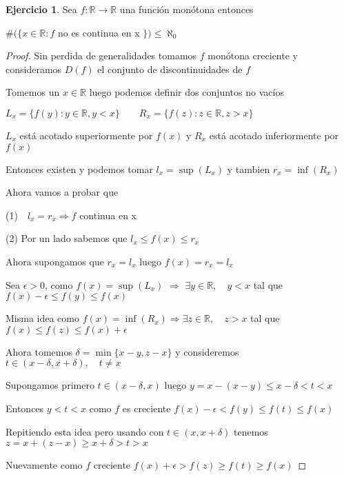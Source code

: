 \documentclass[12pt]{article}
\newcommand{\n}{\aleph_{0}}
\newcommand{\R}{\mathbb{R}}
\newcommand{\Ra}{\Rightarrow}
\newcommand{\ra}{\rightarrow}
\theoremstyle{definition}
\newtheorem{ej}{Ejercicio}
\begin{document}
\begin{ej}
\noindent 
Sea $f: \R \ra \R$ una función monótona entonces 
\begin{center} 
  $\# (\{x \in \R :f $ no es continua en x $\}) \leq \n$
\end{center}

\begin{proof}
  Sin perdida de generalidades tomamos $f$ monótona creciente y consideramos $D(f)$ el conjunto de discontinuidades de $f$

  Tomemos un $x \in \R$ luego podemos definir dos conjuntos no vacíos

  \begin{center} $ L_{x} = \{ f(y) : y \in \R, y<x\} \quad \quad      R_{x} = \{f(z): z \in \R, z>x \}$ \end{center}

  $L_{x}$ está acotado superiormente por $f(x)$ y $R_{x}$ está acotado inferiormente por $f(x)$

  Entonces existen y podemos tomar $l_{x} = \sup (L_{x})$ y tambien $r_{x} = \inf(R_{x})$

  Ahora vamos a probar que \begin{center} (1)$ \quad l_{x} = r_{x} \Ra f$ continua en x \end{center}

  (2) Por un lado sabemos que $ l_{x} \leq f(x) \leq r_{x}$

  Ahora supongamos que $r_{x} = l_{x}$ luego $f(x) = r_{x} = l_{x}$

  Sea $\epsilon  > 0$, como $f(x) = \sup(L_{x})$ $\Ra$ $\exists y \in \R , \quad y < x$ tal que $f(x) - \epsilon \leq f(y) \leq f(x)$

  Misma idea como $f(x) = \inf(R_{x}) \Ra \exists z \in \R,  \quad z > x$ tal que $ f(x) \leq f(z) \leq f(x) + \epsilon$

  Ahora tomemos $\delta = \min\{x - y , z -x \}$ y consideremos $t \in (x - \delta , x + \delta ), \quad t \neq x$

  Supongamos primero $t \in (x - \delta , x)$ luego $y = x - (x - y) \leq x - \delta < t < x$ 

  Entonces $y < t < x $ como $f$ es creciente $ f(x) - \epsilon < f(y) \leq f(t) \leq f(x) $

  Repitiendo esta idea pero usando con $t \in (x , x + \delta)$ tenemos $z = x + (z - x) \geq x + \delta > t > x $ 

  Nuevamente como $f$ creciente $f(x) + \epsilon > f(z) \geq f(t) \geq f(x)$


\end{proof}
\end{ej}
\end{document}
